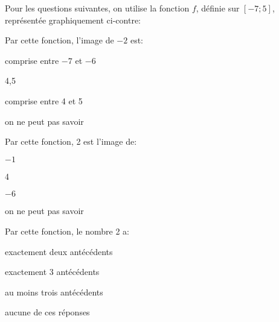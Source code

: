 \begin{QCM}
\begin{EnonceCommunQCM}
\parbox{0.3\linewidth}{Pour les questions suivantes, on utilise la fonction $f$, définie sur $[-7;5]$, représentée graphiquement ci-contre: }\hfill\parbox{0.59\linewidth}{
}
\end{EnonceCommunQCM}

\begin{GroupeQCM}
\begin{exercice}Par cette fonction, l'image de $-2$ est: 
 \begin{ChoixQCM}{2}
\item        comprise entre $-7$ et $-6$
\item 4,5
\item comprise entre 4 et 5
\item on ne peut pas savoir
    \end{ChoixQCM}
    \begin{corrige}
    \end{corrige}
\end{exercice}

\begin{exercice}Par cette fonction, 2 est l'image de: 
 \begin{ChoixQCM}{2}
 \item $-1$
 \item 4
 \item $-6$
 \item on ne peut pas savoir
    \end{ChoixQCM}
     \begin{corrige}
    \end{corrige}
\end{exercice}

\begin{exercice}Par cette  fonction, le nombre 2 a: 
 \begin{ChoixQCM}{2}
\item   exactement deux antécédents
\item exactement 3 antécédents
\item au moins trois antécédents
\item aucune de ces réponses
    \end{ChoixQCM}
     \begin{corrige}
    \end{corrige}
\end{exercice}


\end{GroupeQCM}
\end{QCM}
